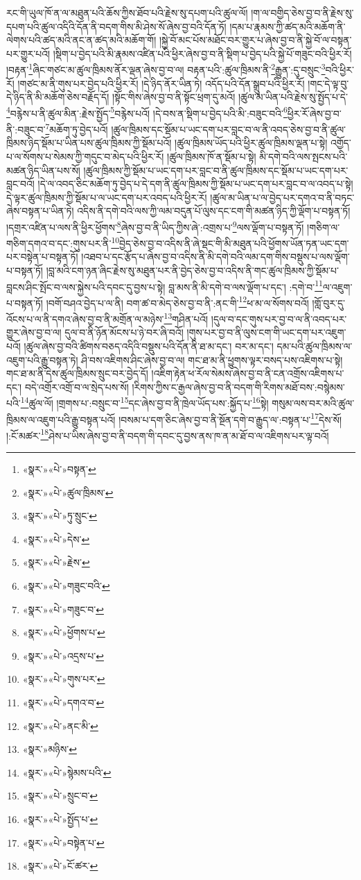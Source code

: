 རང་གི་ཡུལ་ཁོ་ན་ལ་མཐུན་པའི་ཆོས་ཀྱིས་ཐོབ་པའི་རྗེས་སུ་དཔག་པའི་ཚུལ་ལོ། །ག་ལ་བགྱིད་ཅེས་བྱ་བ་ནི་རྗེས་སུ་དཔག་པའི་ཚུལ་འདིའི་དོན་ནི་བདག་གིས་མི་ཤེས་སོ་ཞེས་བྱ་བའི་དོན་ཏོ། །དམ་པ་རྣམས་ཀྱི་ཚད་མའི་མཆོག་ནི་ལེགས་པའི་ཚད་མའི་ནང་ན་ཚད་མའི་མཆོག་གོ། །སྐྱེ་བོ་མང་པོས་མཐོང་བར་གྱུར་པ་ཞེས་བྱ་བ་ནི་སྐྱེ་བོ་ལ་བསྟན་པར་གྱུར་པའོ། །སྡིག་པ་བྱེད་པའི་མི་རྣམས་འཛིན་པའི་ཕྱིར་ཞེས་བྱ་བ་ནི་སྡིག་པ་བྱེད་པའི་སྐྱེ་པོ་གཟུང་བའི་ཕྱིར་རོ། །བརྟན་\footnote{«སྣར་»«པེ་»བསྟན་}ཞིང་གཙང་མ་ཚུལ་ཁྲིམས་ནོར་ལྡན་ཞེས་བྱ་བ་ལ། བརྟན་པའི་:ཚུལ་ཁྲིམས་ནི་\footnote{«སྣར་»«པེ་»ཚུལ་ཁྲིམས་}རྒྱུན་:དུ་བསྲུང་\footnote{«སྣར་»«པེ་»ཏུ་སྲུང་}བའི་ཕྱིར་རོ། །གཙང་མ་ནི་གུས་པར་བྱེད་པའི་ཕྱིར་རོ། །དེ་ཉིད་ནོར་ཡིན་ཏེ། འདོད་པའི་དོན་སྒྲུབ་པའི་ཕྱིར་རོ། །གང་དེ་ལྟ་བུ་དེ་ཉིད་ནི་མི་མཆོག་ཅེས་བརྗོད་དོ། །སྟོང་གིས་ཞེས་བྱ་བ་ནི་སྟོང་ཕྲག་དུ་མའོ། །ཚུལ་མ་ཡིན་པའི་རྗེས་སུ་སྤྱོད་པ་དེ་\footnote{«སྣར་»«པེ་»དེས་}བརྙེས་པ་ནི་ཚུལ་མིན་:རྗེས་སྤྱོད་\footnote{«སྣར་»«པེ་»རྗེས་}བརྙེས་པའོ། །དེ་བས་ན་སྡིག་པ་བྱེད་པའི་མི་:བཟུང་བའི་\footnote{«སྣར་»«པེ་»གཟུང་བའི་}ཕྱིར་རོ་ཞེས་བྱ་བ་ནི་:བཟུང་བ་\footnote{«སྣར་»«པེ་»གཟུང་བ་}མཆོག་ཏུ་བྱེད་པའོ། །ཚུལ་ཁྲིམས་དང་སྡོམ་པ་ཡང་དག་པར་བླང་བ་ལ་ནི་འབད་ཅེས་བྱ་བ་ནི་ཚུལ་ཁྲིམས་ཉིད་སྡོམ་པ་ཡིན་པས་ཚུལ་ཁྲིམས་ཀྱི་སྡོམ་པའོ། །ཚུལ་ཁྲིམས་ཡོད་པའི་ཕྱིར་ཚུལ་ཁྲིམས་ལྡན་པ་སྟེ། འགྱོད་པ་ལ་སོགས་པ་སེམས་ཀྱི་གདུང་བ་མེད་པའི་ཕྱིར་རོ། །ཚུལ་ཁྲིམས་ཁོ་ན་སྡོམ་པ་སྟེ། མི་དགེ་བའི་ལས་སྤངས་པའི་མཚན་ཉིད་ཡིན་པས་སོ། །ཚུལ་ཁྲིམས་ཀྱི་སྡོམ་པ་ཡང་དག་པར་བླང་བ་ནི་ཚུལ་ཁྲིམས་དང་སྡོམ་པ་ཡང་དག་པར་བླང་བའོ། །དེ་ལ་འབད་ཅིང་མཆོག་ཏུ་བྱེད་པ་དེ་དག་ནི་ཚུལ་ཁྲིམས་ཀྱི་སྡོམ་པ་ཡང་དག་པར་བླང་བ་ལ་འབད་པ་སྟེ། དེ་ལྟར་ཚུལ་ཁྲིམས་ཀྱི་སྡོམ་པ་ལ་ཡང་དག་པར་འབད་པའི་ཕྱིར་རོ། །ཚུལ་མ་ཡིན་པ་ལ་བྱེད་པར་དགའ་བ་ནི་བཏང་ཞེས་བསྟན་པ་ཡིན་ཏེ། འདིས་ནི་དགེ་བའི་ལས་ཀྱི་ལམ་བདུན་པོ་ལུས་དང་ངག་གི་མཚན་ཉིད་ཀྱི་ལྡོག་པ་བསྟན་ཏོ། །དགྲར་འཛིན་པ་ལས་ནི་ཕྱིར་ཕྱོགས་\footnote{«སྣར་»«པེ་»ཕྱོགས་པ་}ཞེས་བྱ་བ་ནི་ཡིད་ཀྱིས་ཞེ་:འགྲས་པ་\footnote{«སྣར་»«པེ་»འདྲས་པ་}ལས་ལྡོག་པ་བསྟན་ཏོ། །གཅིག་ལ་གཅིག་དགའ་བ་དང་:གུས་པར་ནི་\footnote{«སྣར་»«པེ་»གུས་པར་}བྱེད་ཅེས་བྱ་བ་འདིས་ནི་ཞེ་སྡང་གི་མི་མཐུན་པའི་ཕྱོགས་ཡོན་ཏན་ཡང་དག་པར་བསྟེན་པ་བསྟན་ཏོ། །འཐབ་པ་དང་རྩོད་པ་ཞེས་བྱ་བ་འདིས་ནི་མི་དགེ་བའི་ལམ་དག་གིས་བསྡུས་པ་ལས་ལྡོག་པ་བསྟན་ཏོ། །བླ་མའི་ངག་ཉན་ཞིང་རྗེས་སུ་མཐུན་པར་ནི་བྱེད་ཅེས་བྱ་བ་འདིས་ནི་གང་ཚུལ་ཁྲིམས་ཀྱི་སྡོམ་པ་བླངས་ཤིང་སྤོང་བ་ལས་སྐྱེས་པའི་དབང་དུ་བྱས་པ་སྟེ། བླ་མས་ནི་མི་དགེ་བ་ལས་ལྡོག་པ་དང་། :དགེ་བ་\footnote{«སྣར་»«པེ་»དགའ་བ་}ལ་འཇུག་པ་བསྟན་ཏོ། །བགོ་བཤའ་བྱེད་པ་ལ་ནི། བག་ཚ་བ་མེད་ཅེས་བྱ་བ་ནི་:ནང་གི་\footnote{«སྣར་»«པེ་»ནང་མི་}ཕ་མ་ལ་སོགས་བའོ། །གློ་བུར་དུ་འོངས་པ་ལ་ནི་དགའ་ཞེས་བྱ་བ་ནི་མགྲོན་ལ་མཉེས་\footnote{«སྣར་»མཉིས་}གཤིན་པའོ། །དུལ་བ་དང་གུས་པར་བྱ་བ་ལ་ནི་འབད་པར་གྱུར་ཞེས་བྱ་བ་ལ། དུལ་བ་ནི་ཉོན་མོངས་པ་ཉེ་བར་ཞི་བའོ། །གུས་པར་བྱ་བ་ནི་ལུས་ངག་གི་ཡང་དག་པར་འཇུག་པའོ། །ཚུལ་ཞེས་བྱ་བའི་ཚིགས་བཅད་འདིའི་བསྡུས་པའི་དོན་ནི་ཐ་མ་དང་། བར་མ་དང་། དམ་པའི་ཚུལ་ཁྲིམས་ལ་འཇུག་པའི་རྒྱུ་བསྟན་ཏེ། ཤི་བས་འཇིགས་ཤིང་ཞེས་བྱ་བ་ལ། གང་ཐ་མ་ནི་ཕྱུགས་ལྟར་བསད་པས་འཇིགས་པ་སྟེ། གང་ཐ་མ་ནི་དེས་ཚུལ་ཁྲིམས་སྲུང་བར་བྱེད་དོ། །འཇིག་རྟེན་ཕ་རོལ་སེམས་ཞེས་བྱ་བ་ནི་ངན་འགྲོས་འཇིགས་པ་དང་། བདེ་འགྲོར་འགྲོ་བ་ལ་སྲེད་པས་སོ། །རིགས་ཀྱིས་ང་རྒྱལ་ཞེས་བྱ་བ་ནི་བདག་གི་རིགས་མཐོ་བས་:བསྙེམས་པའི་\footnote{«སྣར་»«པེ་»སྙེམས་པའི་}ཚུལ་ལོ། །གྲགས་པ་:བསྲུང་བ་\footnote{«སྣར་»«པེ་»སྲུང་བ་}དང་ཞེས་བྱ་བ་ནི་ཁྲེལ་ཡོད་པས་:སྐྱོད་པ་\footnote{«སྣར་»«པེ་»སྤྱོད་པ་}སྟེ། གསུམ་ལས་བར་མའི་ཚུལ་ཁྲིམས་ལ་འཇུག་པའི་རྒྱུ་བསྟན་པའོ། །བསམ་པ་དག་ཅིང་ཞེས་བྱ་བ་ནི་སྔོན་དགེ་བ་རྒྱུད་ལ་:བསྟན་པ་\footnote{«སྣར་»«པེ་»བསྟེན་པ་}དེས་སོ། །:ངོ་མཚར་\footnote{«སྣར་»«པེ་»ངོ་ཚར་}ཤེས་པ་ཡིས་ཞེས་བྱ་བ་ནི་བདག་གི་དབང་དུ་བྱས་ནས་ཁ་ན་མ་ཐོ་བ་ལ་འཇིགས་པར་ལྟ་བའོ། 